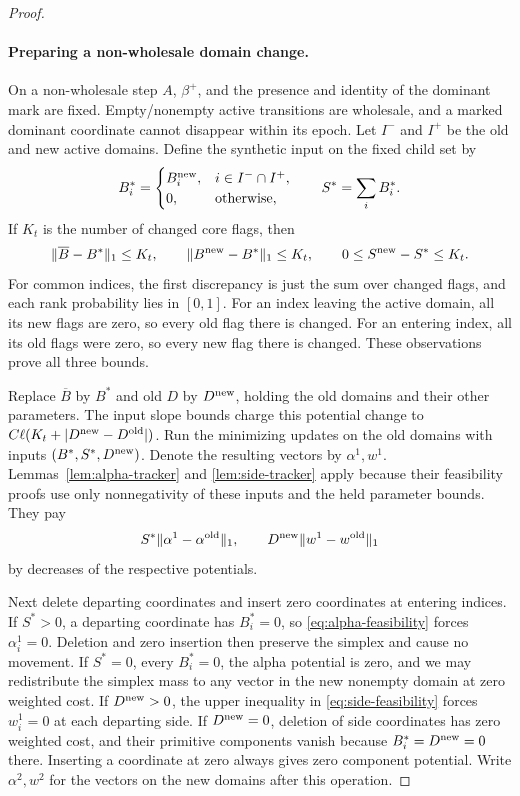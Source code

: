 \begin{proof}
\paragraph{Preparing a non-wholesale domain change.}
On a non-wholesale step $A$, $\beta^+$, and the presence and
identity of the dominant mark are fixed.  Empty/nonempty active
transitions are wholesale, and a marked dominant coordinate
cannot disappear within its epoch.  Let $I^-$ and $I^+$ be the
old and new active domains.  Define the synthetic input on the
fixed child set by
\begin{equation}\label{eq:synthetic-core-input}
 B_i^*=\begin{cases}B_i^{\rm new},&i\in I^-\cap I^+,\\
                     0,&\text{otherwise},\end{cases}
 \qquad S^*=\sum_iB_i^*.
\end{equation}
If $K_t$ is the number of changed core flags, then
\begin{equation}\label{eq:synthetic-core-errors}
 \|\overline B-B^*\|_1\le K_t,
 \qquad \|B^{\rm new}-B^*\|_1\le K_t,
 \qquad 0\le S^{\rm new}-S^*\le K_t.
\end{equation}
For common indices, the first discrepancy is just the sum over
changed flags, and each rank probability lies in $[0,1]$.
For an index leaving the active domain, all its new flags are
zero, so every old flag there is changed.  For an entering index,
all its old flags were zero, so every new flag there is changed.
These observations prove all three bounds.

Replace $\overline B$ by $B^*$ and old $D$ by $D^{\rm new}$,
holding the old domains and their other parameters.  The input
slope bounds charge this potential change to
$C\ell(K_t+|D^{\rm new}-D^{\rm old}|)$.
Run the minimizing updates on the old domains with inputs
$(B^*,S^*,D^{\rm new})$.  Denote the resulting vectors by
$\alpha^1,w^1$.  Lemmas~\ref{lem:alpha-tracker} and
\ref{lem:side-tracker} apply because their feasibility proofs use
only nonnegativity of these inputs and the held parameter bounds.
They pay
\begin{equation}\label{eq:prepared-movement}
 S^*\|\alpha^1-\alpha^{\rm old}\|_1,
 \qquad D^{\rm new}\|w^1-w^{\rm old}\|_1
\end{equation}
by decreases of the respective potentials.

Next delete departing coordinates and insert zero coordinates at
entering indices.  If $S^*>0$, a departing coordinate has
$B_i^*=0$, so \eqref{eq:alpha-feasibility} forces
$\alpha_i^1=0$.  Deletion and zero insertion then preserve the
simplex and cause no movement.  If $S^*=0$, every $B_i^*=0$,
the alpha potential is zero, and we may redistribute the simplex
mass to any vector in the new nonempty domain at zero weighted
cost.  If $D^{\rm new}>0$, the upper inequality in
\eqref{eq:side-feasibility} forces $w_i^1=0$ at each departing
side.  If $D^{\rm new}=0$, deletion of side coordinates has zero
weighted cost, and their primitive components vanish because
$B_i^*=D^{\rm new}=0$ there.  Inserting a coordinate at zero
always gives zero component potential.  Write $\alpha^2,w^2$
for the vectors on the new domains after this operation.


\end{proof}
